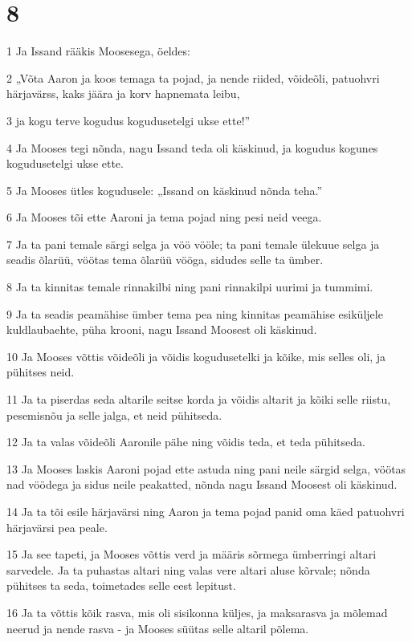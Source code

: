 \chapter{8}

\par 1 Ja Issand rääkis Moosesega, öeldes:
\par 2 „Võta Aaron ja koos temaga ta pojad, ja nende riided, võideõli, patuohvri härjavärss, kaks jäära ja korv hapnemata leibu,
\par 3 ja kogu terve kogudus kogudusetelgi ukse ette!”
\par 4 Ja Mooses tegi nõnda, nagu Issand teda oli käskinud, ja kogudus kogunes kogudusetelgi ukse ette.
\par 5 Ja Mooses ütles kogudusele: „Issand on käskinud nõnda teha.”
\par 6 Ja Mooses tõi ette Aaroni ja tema pojad ning pesi neid veega.
\par 7 Ja ta pani temale särgi selga ja vöö vööle; ta pani temale ülekuue selga ja seadis õlarüü, vöötas tema õlarüü vööga, sidudes selle ta ümber.
\par 8 Ja ta kinnitas temale rinnakilbi ning pani rinnakilpi uurimi ja tummimi.
\par 9 Ja ta seadis peamähise ümber tema pea ning kinnitas peamähise esiküljele kuldlaubaehte, püha krooni, nagu Issand Moosest oli käskinud.
\par 10 Ja Mooses võttis võideõli ja võidis kogudusetelki ja kõike, mis selles oli, ja pühitses neid.
\par 11 Ja ta piserdas seda altarile seitse korda ja võidis altarit ja kõiki selle riistu, pesemisnõu ja selle jalga, et neid pühitseda.
\par 12 Ja ta valas võideõli Aaronile pähe ning võidis teda, et teda pühitseda.
\par 13 Ja Mooses laskis Aaroni pojad ette astuda ning pani neile särgid selga, vöötas nad vöödega ja sidus neile peakatted, nõnda nagu Issand Moosest oli käskinud.
\par 14 Ja ta tõi esile härjavärsi ning Aaron ja tema pojad panid oma käed patuohvri härjavärsi pea peale.
\par 15 Ja see tapeti, ja Mooses võttis verd ja määris sõrmega ümberringi altari sarvedele. Ja ta puhastas altari ning valas vere altari aluse kõrvale; nõnda pühitses ta seda, toimetades selle eest lepitust.
\par 16 Ja ta võttis kõik rasva, mis oli sisikonna küljes, ja maksarasva ja mõlemad neerud ja nende rasva - ja Mooses süütas selle altaril põlema.
